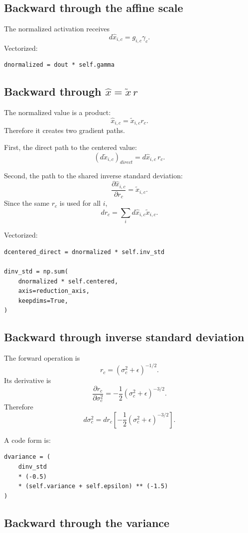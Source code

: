 \documentclass[11pt,a4paper]{article}
\newcommand{\pd}[2]{\frac{\partial #1}{\partial #2}}
\begin{document}
\subsection{Backward through the affine scale}

The normalized activation receives
\[
\boxed{
d\hat{x}_{i,c}=g_{i,c}\gamma_c}.
\]
Vectorized:
\begin{lstlisting}
dnormalized = dout * self.gamma
\end{lstlisting}

\subsection{Backward through $\hat{x}=\tilde{x}\,r$}

The normalized value is a product:
\[
\hat{x}_{i,c}=\tilde{x}_{i,c}r_c.
\]
Therefore it creates two gradient paths.

First, the direct path to the centered value:
\[
\left(d\tilde{x}_{i,c}\right)_{direct}
=
d\hat{x}_{i,c}\,r_c.
\]

Second, the path to the shared inverse standard deviation:
\[
\pd{\hat{x}_{i,c}}{r_c}=\tilde{x}_{i,c}.
\]
Since the same $r_c$ is used for all $i$,
\[
\boxed{
dr_c=\sum_i d\hat{x}_{i,c}\tilde{x}_{i,c}}.
\]

Vectorized:
\begin{lstlisting}
dcentered_direct = dnormalized * self.inv_std

dinv_std = np.sum(
    dnormalized * self.centered,
    axis=reduction_axis,
    keepdims=True,
)
\end{lstlisting}

\subsection{Backward through inverse standard deviation}

The forward operation is
\[
r_c=(\sigma_c^2+\epsilon)^{-1/2}.
\]
Its derivative is
\[
\pd{r_c}{\sigma_c^2}
=-\frac{1}{2}(\sigma_c^2+\epsilon)^{-3/2}.
\]
Therefore
\[
\boxed{
d\sigma_c^2
=dr_c\left[-\frac{1}{2}(\sigma_c^2+\epsilon)^{-3/2}\right]}.
\]

A code form is:
\begin{lstlisting}
dvariance = (
    dinv_std
    * (-0.5)
    * (self.variance + self.epsilon) ** (-1.5)
)
\end{lstlisting}

\subsection{Backward through the variance}
\end{document}

